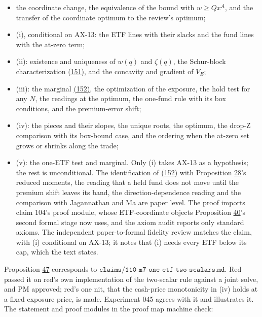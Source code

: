 \documentclass[11pt]{article}
\begin{document}
\begin{itemize}
  \item the coordinate change, the equivalence of the bound with \(w\geq Qx^A\), and
  the transfer of the coordinate optimum to the review's optimum;
  \item (i), conditional on AX-13: the ETF lines with their slacks and the
  fund lines with the at-zero term;
  \item (ii): existence and uniqueness of \(w(q)\) and \(\zeta(q)\), the Schur-block
  characterization \hyperref[eq:151]{(151)}, and the concavity and gradient of \(V_E\);
  \item (iii): the marginal \hyperref[eq:152]{(152)}, the optimization of the exposure, the
  hold test for any \(N\), the readings at the optimum, the one-fund rule
  with its box conditions, and the premium-error shift;
  \item (iv): the pieces and their slopes, the unique roots, the optimum, the
  drop-Z comparison with its box-bound case, and the ordering when the
  at-zero set grows or shrinks along the trade;
  \item (v): the one-ETF test and marginal.
Only (i) takes AX-13 as a hypothesis; the rest is unconditional. The
identification of \hyperref[eq:152]{(152)} with Proposition \hyperref[res:Proposition-28]{28}'s reduced moments, the
reading that a held fund does not move until the premium shift leaves
its band, the direction-dependence reading and the comparison with
Jagannathan and Ma are paper level. The proof imports claim 104's proof
module, whose ETF-coordinate objects Proposition \hyperref[res:Proposition-40]{40}'s second formal
stage now uses, and the axiom audit reports only standard axioms. The
independent paper-to-formal fidelity review matches the claim, with (i)
conditional on AX-13; it notes that (i) needs every ETF below its cap,
which the text states.
\end{itemize}

Proposition \hyperref[res:Proposition-47]{47} corresponds to
\(\texttt{claims/110-m7-one-etf-two-scalars.md}\). Red passed it on red's own
implementation of the two-scalar rule against a joint solve, and PM
approved; red's one nit, that the cash-price monotonicity in (iv) holds
at a fixed exposure price, is made. Experiment 045 agrees with it and
illustrates it. The statement and proof modules in the proof map machine
check:
\end{document}
